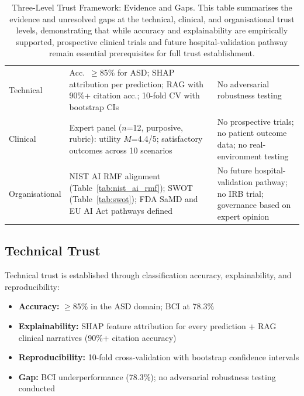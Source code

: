 \begin{table}[H]
\tablestripes\tablefontsize
\tablefontsize
\centering
\caption[Three-Level Trust Framework: Evidence and Gaps]{Three-Level Trust Framework: Evidence and Gaps. This table summarises the evidence and unresolved gaps at the technical, clinical, and organisational trust levels, demonstrating that while accuracy and explainability are empirically supported, prospective clinical trials and future hospital-validation pathway remain essential prerequisites for full trust establishment.}
\begin{tabularx}{\textwidth}{@{} >{\raggedright\arraybackslash}p{1.8cm} L L @{}}
\toprule
{} &  &  \\
\midrule
Technical & Acc.\ $\geq$85\% for ASD; SHAP attribution per prediction; RAG with 90\%+ citation acc.; 10-fold CV with bootstrap CIs & No adversarial robustness testing \\
\addlinespace
Clinical & Expert panel ($n$=12, purposive, rubric): utility $M$=4.4/5; satisfactory outcomes across 10 scenarios & No prospective trials; no patient outcome data; no real-environment testing \\
\addlinespace
Organisational & NIST AI RMF alignment (Table~\ref{tab:nist_ai_rmf}); SWOT (Table~\ref{tab:swot}); FDA SaMD and EU AI Act pathways defined & No future hospital-validation pathway; no IRB trial; governance based on expert opinion \\
\bottomrule
\end{tabularx}
\end{table}

\iffalse
\subsection{Technical Trust}

Technical trust is established through classification accuracy, explainability, and reproducibility:

\begin{itemize}
    \item \textbf{Accuracy:} $\geq$85\% in the ASD domain; BCI at 78.3\%
    \item \textbf{Explainability:} SHAP feature attribution for every prediction + RAG clinical narratives (90\%+ citation accuracy)
    \item \textbf{Reproducibility:} 10-fold cross-validation with bootstrap confidence intervals
    \item \textbf{Gap:} BCI underperformance (78.3\%); no adversarial robustness testing conducted
\end{itemize}

